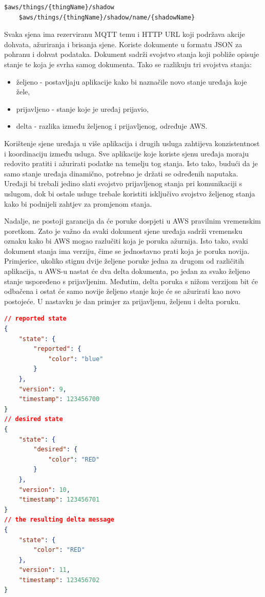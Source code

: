 \begin{lstlisting}[caption={Teme za sjene uređaja}]
	$aws/things/{thingName}/shadow
	$aws/things/{thingName}/shadow/name/{shadowName}
\end{lstlisting}

Svaka sjena ima rezerviranu MQTT temu i HTTP URL koji podržava akcije dohvata, ažuriranja i brisanja sjene. Koriste dokumente u formatu JSON za pohranu i dohvat podataka. Dokument sadrži svojstvo stanja koji pobliže opisuje stanje te koja je svrha samog dokumenta. Tako se razlikuju tri svojstva stanja:
\begin{itemize}
	\item željeno  - postavljaju aplikacije kako bi naznačile novo stanje uređaja koje žele,
	\item prijavljeno  - stanje koje je uređaj prijavio,
	\item delta - razlika između željenog i prijavljenog, određuje AWS.
\end{itemize}

Korištenje sjene uređaja u više aplikacija i drugih usluga zahtijeva konzistentnost i koordinaciju između usluga. Sve aplikacije koje koriste sjenu uređaja moraju redovito pratiti i ažurirati podatke na temelju tog stanja. Isto tako, budući da je samo stanje uređaja dinamično, potrebno je držati se određenih naputaka. Uređaji bi trebali jedino slati svojstvo prijavljenog stanja pri komunikaciji s uslugom, dok bi ostale usluge trebale koristiti isključivo svojstvo željenog stanja kako bi podnijeli zahtjev za promjenom stanja. 

Nadalje, ne postoji garancija da će poruke dospjeti u AWS pravilnim vremenskim poretkom. Zato je važno da svaki dokument sjene uređaja sadrži vremensku oznaku  kako bi AWS mogao razlučiti koja je poruka ažurnija. Isto tako, svaki dokument stanja ima verziju, čime se jednostavno prati koja je poruka novija. Primjerice, ukoliko stignu dvije željene poruke jedna za drugom od različitih aplikacija, u AWS-u nastat će dva delta dokumenta, po jedan za svako željeno stanje uspoređeno s prijavljenim. Međutim, delta poruka s nižom verzijom bit će odbačena i ostat će samo novije željeno stanje koje će se ažurirati kao novo postojeće. U nastavku je dan primjer za prijavljenu, željenu i delta poruku. 

\begin{lstlisting}[caption={Poruke sjene uređaja}, language=json]
// reported state
{
	"state": {
		"reported": {
			"color": "blue"
		}
	},
	"version": 9,
	"timestamp": 123456700
}
// desired state
{
	"state": {
		"desired": {
			"color": "RED"
		}
	},
	"version": 10,
	"timestamp": 123456701
}
// the resulting delta message
{
	"state": {
		"color": "RED"
	},
	"version": 11,
	"timestamp": 123456702
}
\end{lstlisting}

